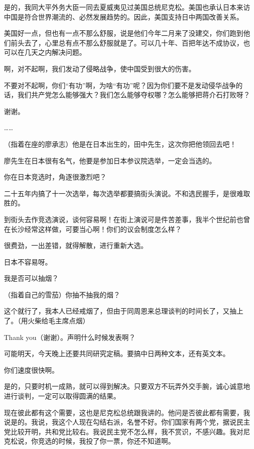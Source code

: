 是的，我同大平外务大臣一同去夏威夷见过美国总统尼克松。美国也承认日本来访中国是符合世界潮流的、必然发展趋势的。因此，美国支持日中两国改善关系。

美国好一点，但也有一点不那么舒服，说是他们今年二月来了没建交，你们跑到他们前头去了，心里总有点不那么舒服就是了。可以几十年、百把年达不成协议，也可以在几天之内解决问题。

啊，对不起啊，我们发动了侵略战争，使中国受到很大的伤害。

不要对不起啊，你们“有功”啊，为啥“有功”呢？因为你们要不是发动侵华战争的话，我们共产党怎么能够强大？我们怎么能够夺权哪？怎么能够把蒋介石打败呀？

谢谢。

……

（指着在座的廖承志）他是在日本出生的，田中先生，这次你把他领回去吧！

廖先生在日本很有名气，他要是参加日本参议院选举，一定会当选的。

你在日本竞选时，角逐很激烈吧？

二十五年内搞了十一次选举，每次选举都要搞街头演说。不和选民握手，是很难取胜的。

到街头去作竞选演说，谈何容易啊！在街上演说可是件苦差事，我半个世纪前也曾在长沙经常这样做，可要当心啊！你们的议会制度怎么样？

很费劲，一出差错，就得解散，进行重新大选。

日本不容易呀。

我是否可以抽烟？

（指着自己的雪茄）你抽不抽我的烟？

这个就行了，我本人已经戒烟了，但由于同周恩来总理谈判的时间长了，又抽上了。（用火柴给毛主席点烟）

 Thank you（谢谢）。声明什么时候发表啊？

可能明天，今天晚上还要共同研究定稿。要搞中日两种文本，还有英文本。

你们速度很快啊。

是的，只要时机一成熟，就可以得到解决。只要双方不玩弄外交手腕，诚心诚意地进行谈判，一定可以取得圆满的结果。

现在彼此都有这个需要，这也是尼克松总统跟我讲的。他问是否彼此都有需要，我说是的。我说，我这个人现在勾结右派，名誉不好。你们国家有两个党，据说民主党比较开明，共和党比较右。我说民主党不怎么样，我不赏识，不感兴趣。我对尼克松说，你竞选的时候，我投了你一票，你还不知道啊。

